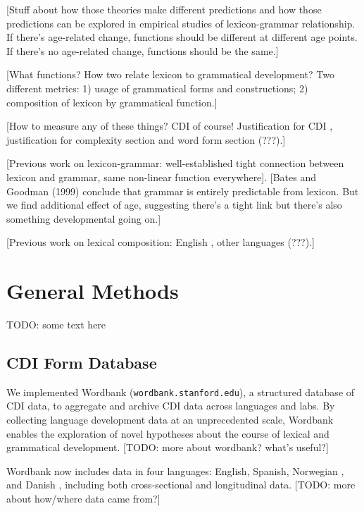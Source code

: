 \documentclass[10pt,letterpaper]{article}
\begin{document}
[Stuff about how those theories make different predictions and how those predictions can be explored in empirical studies of lexicon-grammar relationship. If there's age-related change, functions should be different at different age points. If there's no age-related change, functions should be the same.]

[What functions? How two relate lexicon to grammatical development? Two different metrics: 1) usage of grammatical forms and constructions; 2) composition of lexicon by grammatical function.]

[How to measure any of these things? CDI of course! Justification for CDI \cite{fenson1994}, justification for complexity section \cite{dale1991,dale1989} and word form section (???).]

[Previous work on lexicon-grammar: well-established tight connection between lexicon and grammar, same non-linear function everywhere]. [Bates and Goodman (1999) conclude that grammar is entirely predictable from lexicon. But we find additional effect of age, suggesting there's a tight link but there's also something developmental going on.]

[Previous work on lexical composition: English \cite{bates1994}, other languages (???).]

\clearpage

\section{General Methods}

TODO: some text here

\subsection{CDI Form Database}

We implemented Wordbank (\texttt{wordbank.stanford.edu}), a structured database of CDI data, to aggregate and archive CDI data across languages and labs. By collecting language development data at an unprecedented scale, Wordbank enables the exploration of novel hypotheses about the course of lexical and grammatical development. [TODO: more about wordbank? what's useful?]

Wordbank now includes data in four languages: English, Spanish, Norwegian \cite{kristoffersen2013,simonsen2014}, and Danish \cite{andersen2006}, including both cross-sectional and longitudinal data.
[TODO: more about how/where data came from?]
\end{document}
